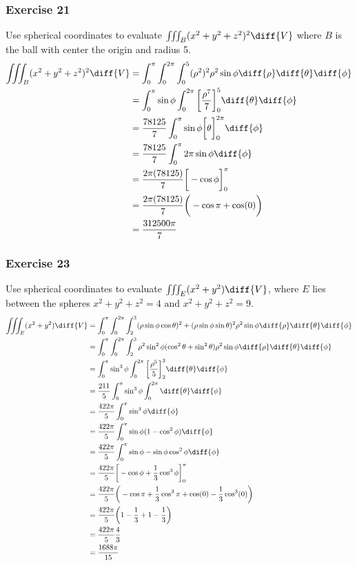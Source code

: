 \documentclass{math}
\begin{document}
\subsubsection*{Exercise 21}
Use spherical coordinates to evaluate \( \iiint_{B}(x^2+y^2+z^2)^2\diff{V} \)
where \( B \) is the ball with center the origin and radius 5.
\begin{align*}
  \iiint_{B}(x^2+y^2+z^2)^2\diff{V} &=
    \int_{0}^{\pi}\int_{0}^{2\pi}\int_{0}^{5}(\rho^2)^2\rho^2\sin\phi
    \diff{\rho}\diff{\theta}\diff{\phi} \\
  &= \int_{0}^{\pi}\sin\phi\int_{0}^{2\pi}
    \bigg[\frac{\rho^7}{7}\bigg]_{0}^{5}\diff{\theta}\diff{\phi} \\
  &= \frac{78125}{7}\int_{0}^{\pi}\sin\phi
    \bigg[\theta\bigg]_{0}^{2\pi}\diff{\phi} \\
  &= \frac{78125}{7}\int_{0}^{\pi}2\pi\sin\phi\diff{\phi} \\
  &= \frac{2\pi(78125)}{7}\bigg[-\cos\phi\bigg]_{0}^{\pi} \\
  &= \frac{2\pi(78125)}{7}\bigg(-\cos\pi+\cos(0)\bigg) \\
  &= \frac{312500\pi}{7}
\end{align*}

\subsubsection*{Exercise 23}
Use spherical coordinates to evaluate \( \iiint_{E}(x^2+y^2)\diff{V} \), where
\( E \) lies between the spheres \( x^2+y^2+z^2 = 4 \) and
\( x^2+y^2+z^2 = 9 \).
\begin{align*}
  \iiint_{E}(x^2+y^2)\diff{V} &= \int_{0}^{\pi}\int_{0}^{2\pi}\int_{2}^{3}
    (\rho\sin\phi\cos\theta)^2+(\rho\sin\phi\sin\theta)^2\rho^2\sin\phi
    \diff{\rho}\diff{\theta}\diff{\phi} \\
  &= \int_{0}^{\pi}\int_{0}^{2\pi}\int_{2}^{3}
    \rho^2\sin^2\phi(\cos^2\theta+\sin^2\theta)\rho^2\sin\phi
    \diff{\rho}\diff{\theta}\diff{\phi} \\
  &= \int_{0}^{\pi}\sin^3\phi\int_{0}^{2\pi}
    \bigg[\frac{\rho^5}{5}\bigg]_{2}^{3}\diff{\theta}\diff{\phi} \\
  &= \frac{211}{5}\int_{0}^{\pi}\sin^3\phi\int_{0}^{2\pi}
    \diff{\theta}\diff{\phi} \\
  &= \frac{422\pi}{5}\int_{0}^{\pi}\sin^3\phi\diff{\phi} \\
  &= \frac{422\pi}{5}\int_{0}^{\pi}\sin\phi(1-\cos^2\phi)\diff{\phi} \\
  &= \frac{422\pi}{5}\int_{0}^{\pi}\sin\phi-\sin\phi\cos^2\phi\diff{\phi} \\
  &= \frac{422\pi}{5}\bigg[-\cos\phi+\frac{1}{3}\cos^3\phi\bigg]_{0}^{\pi} \\
  &= \frac{422\pi}{5}
    \bigg(-\cos\pi+\frac{1}{3}\cos^3\pi+\cos(0)-\frac{1}{3}\cos^3(0)\bigg) \\
  &= \frac{422\pi}{5}\bigg(1-\frac{1}{3}+1-\frac{1}{3}\bigg) \\
  &= \frac{422\pi}{5}\frac{4}{3} \\
  &= \frac{1688\pi}{15}
\end{align*}
\end{document}
